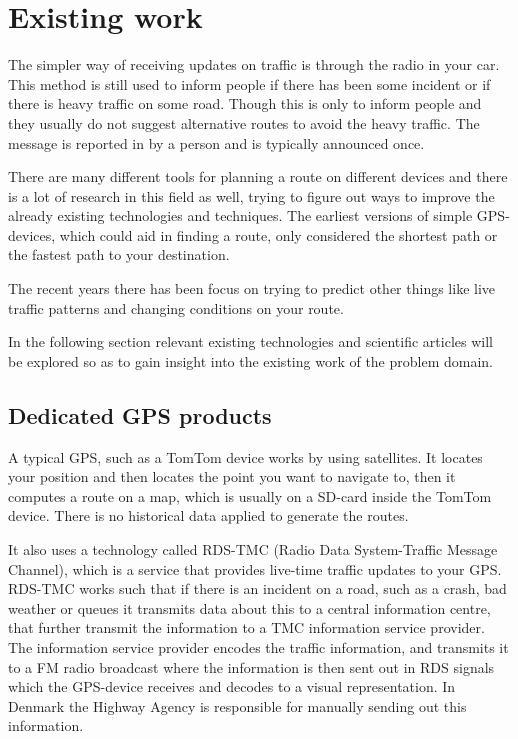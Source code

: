 \section{Existing work}
The simpler way of receiving updates on traffic is through the radio in your car. This method is still used to inform people if there has been some incident or if there is heavy traffic on some road. Though this is only to inform people and they usually do not suggest alternative routes to avoid the heavy traffic. The message is reported in by a person and is typically announced once. 

There are many different tools for planning a route on different devices and there is  a lot of research in this field as well, trying to figure out ways to improve the already existing technologies and techniques. The earliest versions of simple GPS-devices, which could aid in finding a route, only considered the shortest path or the fastest path to your destination.

The recent years there has been focus on trying to predict other things like live traffic patterns and changing conditions on your route.

In the following section relevant existing technologies and scientific articles will be explored so as to gain insight into the existing work of the problem domain.
\subsection*{Dedicated GPS products}
A typical GPS, such as a TomTom device works by using satellites. It locates your position and then locates the point you want to navigate to, then it computes a route on a map, which is usually on a SD-card inside the TomTom device. There is no historical data applied to generate the routes.

It also uses a technology called RDS-TMC (Radio Data System-Traffic Message Channel), which is a service that provides live-time traffic updates to your GPS. RDS-TMC works such that if there is an incident on a road, such as a crash, bad weather or queues it transmits data about this to a central information centre, that further transmit the information to a TMC information service provider. The information service provider encodes the traffic information, and transmits it to a FM radio broadcast where the information is then sent out in RDS signals which the GPS-device receives and decodes to a visual representation. In Denmark the Highway Agency is responsible for manually sending out this information\cite{Vejdirektorat}. 

